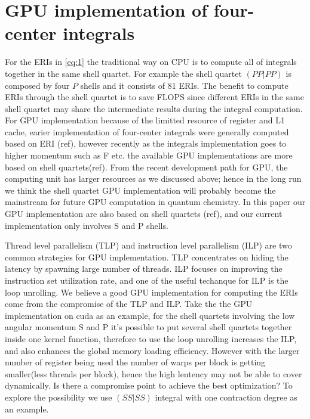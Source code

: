 \documentclass[num-refs]{wiley-article}
\begin{document}
\section{GPU implementation of four-center integrals}

For the ERIs in \ref{eq:1} the traditional way on CPU is to compute all of integrals together in the same shell quartet. For example the shell quartet $(PP|PP)$ is composed by four $P$ shells and it consists of 81 ERIs. The benefit to compute ERIs through the shell quartet is to save FLOPS since different ERIs in the same shell quartet may share the intermediate results during the integral computation. For GPU implementation because of the limitted resource of register and L1 cache, earier implementation of four-center integrals were generally computed based on ERI (ref), however recently as the integrals implementation goes to higher momentum such as F etc. the available GPU implementations are more based on shell quartets(ref). From the recent development path for GPU, the computing unit has larger resources as we discussed above; hence in the long run we think the shell quartet GPU implementation will probably become the mainstream for future GPU computation in quantum chemistry. In this paper our GPU implementation are also based on shell quartets (ref), and our current implementation only involves S and P shells.

Thread level parallelism (TLP) and instruction level parallelism (ILP) are two common strategies for GPU implementation. TLP concentrates on hiding the latency by spawning large number of threads. ILP focuses on improving the instruction set utilization rate, and one of the useful techanque for ILP is the loop unrolling. We believe a good GPU implementation for computing the ERIs come from the compromise of the TLP and ILP. Take the the GPU implementation on cuda as an example, for the shell quartets involving the low angular momentum S and P it's possible to put several shell quartets together inside one kernel function, therefore to use the loop
unrolling increases the ILP, and also enhances the global memory loading efficiency. However with the larger number of register being used the number of warps per block is getting smaller(less threads per block), hence the high lentency may not be able to cover dynamically. Is there a compromise point to achieve the best optimization? To explore the possibility we use $(SS|SS)$ integral with one contraction degree as an example. 
\end{document}
